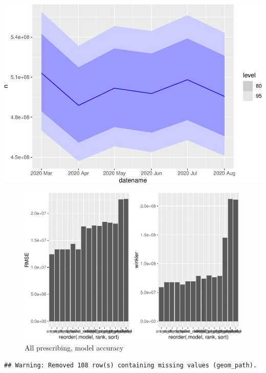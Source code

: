 \documentclass[
  english,
  man,floatsintext]{apa7}
\begin{document}
\includegraphics{paper_files/figure-latex/all-prescribing-modelling-1.pdf}

\begin{figure}
\centering
\includegraphics{paper_files/figure-latex/all-prescribing-model-accuracy-hist-1.pdf}
\caption{\label{fig:all-prescribing-model-accuracy-hist}All prescribing, model accuracy}
\end{figure}

\begin{verbatim}
## Warning: Removed 108 row(s) containing missing values (geom_path).
\end{verbatim}
\end{document}
